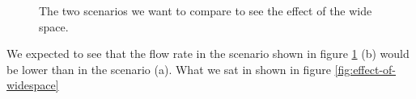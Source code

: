 \begin{figure}[h]
\centering
{}
\caption{The two scenarios we want to compare to see the effect of the wide space.}
\label{fig:chokepoint}
\end{figure}

We expected to see that the flow rate in the scenario shown in figure 
\ref{fig:chokepoint} (b) would be lower than in the scenario (a). What we sat 
in shown in figure \ref{fig:effect-of-widespace}


